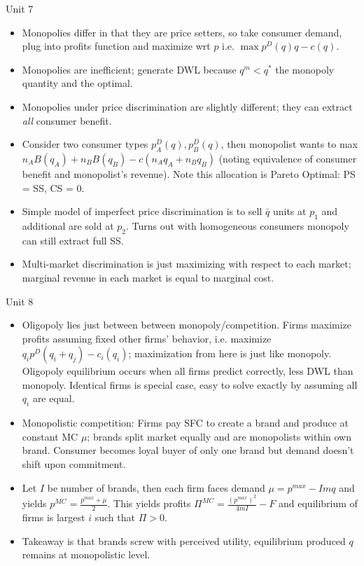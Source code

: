 \documentclass[10pt,twocolumn]{article}
\begin{document}
Unit 7
\begin{itemize}
    \item Monopolies differ in that they are price setters, so take consumer demand, plug into profits function and maximize wrt $p$ i.e. $\operatorname{max} p^D(q)q - c(q)$.
    \item Monopolies are inefficient; generate DWL because $q^m < q^*$ the monopoly quantity and the optimal.
    \item Monopolies under price discrimination are slightly different; they can extract \emph{all} consumer benefit.
    \item Consider two consumer types $p_A^D(q), p_B^D(q)$, then monopolist wants to max $n_AB(q_A) + n_BB(q_B) - c(n_Aq_A + n_Bq_B)$ (noting equivalence of consumer benefit and monopolist's revenue). Note this allocation is Pareto Optimal: PS = SS, CS = 0. 
    \item Simple model of imperfect price discrimination is to sell $\bar{q}$ units at $p_1$ and additional are sold at $p_2$. Turns out with homogeneous consumers monopoly can still extract full SS.
    \item Multi-market discrimination is just maximizing with respect to each market; marginal revenue in each market is equal to marginal cost.
\end{itemize}

Unit 8
\begin{itemize}
    \item Oligopoly lies just between between monopoly/competition. Firms maximize profits assuming fixed other firms' behavior, i.e. maximize $q_i p^D(q_i + q_j) - c_i(q_i)$; maximization from here is just like monopoly. Oligopoly equilibrium occurs when all firms predict correctly, less DWL than monopoly. Identical firms is special case, easy to solve exactly by assuming all $q_i$ are equal.
    \item Monopolistic competition: Firms pay SFC to create a brand and produce at constant MC $\mu$; brands split market equally and are monopolists within own brand. Consumer becomes loyal buyer of only one brand but demand doesn't shift upon commitment.
    \item Let $I$ be number of brands, then each firm faces demand $\mu = p^{max} - Imq$ and yields $p^{MC} = \frac{p^{max} + \mu}{2}$. This yields profits $\Pi^{MC} = \frac{\left( p^{max} \right)^2}{4mI} - F$ and equilibrium of firms is largest $i$ such that $\Pi > 0$. 
    \item Takeaway is that brands screw with perceived utility, equilibrium produced $q$ remains at monopolistic level. 
\end{itemize}
\end{document}
